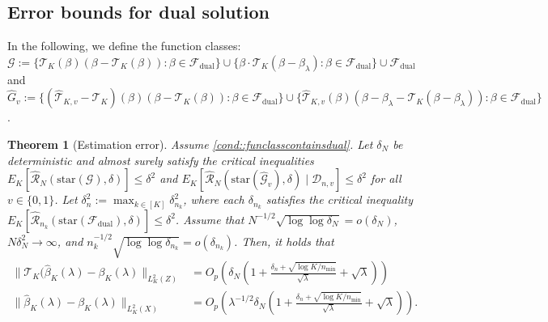 \documentclass[11pt]{article}
\theoremstyle{plain}
\newtheorem{theorem}{Theorem}
\theoremstyle{definition}
\theoremstyle{remark}
\theoremstyle{definition}
\begin{document}
 

\subsection{Error bounds for dual solution}

 



In the following, we define the function classes: $\mathcal{G} := \{ \mathcal{T}_{K}(\beta)(\beta - \mathcal{T}_{K}(\beta)) : \beta \in \mathcal{F}_{\mathrm{dual}} \} \cup \{ \beta \cdot \mathcal{T}_{K}(\beta - \beta_\lambda) : \beta \in \mathcal{F}_{\mathrm{dual}} \} \cup \mathcal{F}_{\mathrm{dual}}$  and  $\widehat{G}_v := \{ (\widehat{\mathcal{T}}_{K,v} - \mathcal{T}_{K})(\beta)(\beta - \mathcal{T}_{K}(\beta)) : \beta \in \mathcal{F}_{\mathrm{dual}} \} \cup \{ \widehat{\mathcal{T}}_{K,v}(\beta)(\beta - \beta_\lambda - \mathcal{T}_{K}(\beta - \beta_\lambda)) : \beta \in \mathcal{F}_{\mathrm{dual}} \}$.  

\begin{theorem}[Estimation error] 
\label{theorem::estimationerror} 
Assume \ref{cond::funclasscontainsdual}. Let $\delta_N$ be deterministic and almost surely satisfy the critical inequalities $E_K[\widehat{\mathcal{R}}_N(\text{star}(\mathcal{G}), \delta)]\leq \delta^2$ and $E_K[\widehat{\mathcal{R}}_N(\text{star}(\widehat{\mathcal{G}}_v), \delta) \mid \mathcal{D}_{n,v}] \leq \delta^2$ for all $v \in \{0,1\}$. Let $\delta_n^2 := \max_{k \in [K]} \delta_{n_k}^2$, where each $\delta_{n_k}$ satisfies the critical inequality $E_K[\widehat{\mathcal{R}}_{n_k}(\text{star}(\mathcal{F}_{\mathrm{dual}}), \delta)] \leq \delta^2 $.  Assume that $ N^{-1/2} \sqrt{\log \log \delta_{N}} =  o(\delta_{N})$, $N\delta_N^2\rightarrow \infty$, and $ n_k^{-1/2} \sqrt{\log \log \delta_{n_k}} =  o(\delta_{n_k})$. Then, it holds that
\begin{align*}
\|\mathcal{T}_{K}(\widehat{\beta}_K(\lambda)-\beta_{K}(\lambda)\|_{L^2_K(Z)}& = O_p\left( \delta_N \left( 1 + \frac{\delta_n + \sqrt{\log K / n_{\min}}}{\sqrt{\lambda}}  + \sqrt{\lambda} \right)\right)\\
\|\widehat{\beta}_K(\lambda)-\beta_{K}(\lambda)\|_{L^2_K(X)} &= O_p\left( \lambda^{-1/2} \delta_N \left( 1 + \frac{\delta_n + \sqrt{\log K / n_{\min}}}{\sqrt{\lambda}}  + \sqrt{\lambda} \right)\right).
\end{align*} 
\end{theorem}

 
\end{document}
